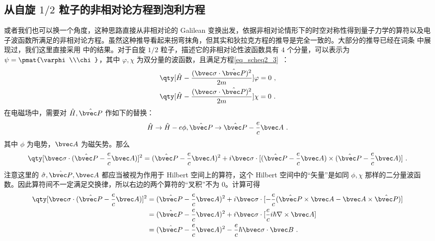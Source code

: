 \subsection{从自旋 $1/2$ 粒子的非相对论方程到泡利方程}
或者我们也可以换一个角度，这种思路直接从非相对论的 Galilean 变换出发\cite{刘觉平}，依据非相对论情形下的时空对称性得到量子力学的算符以及电子波函数所满足的非相对论方程。虽然这种推导看起来拐弯抹角，但其实和狄拉克方程的推导是完全一致的。大部分的推导已经在词条  中展现过，我们这里直接采用 中的结果。对于自旋 $1/2$ 粒子，描述它的非相对论性波函数具有 $4$ 个分量，可以表示为 $\psi=\pmat{\varphi\\\chi}$，其中 $\varphi,\chi$ 为双分量的波函数，且满足方程\autoref{eq_scheq2_3}~：
\begin{equation}
\begin{aligned}
&\qty[\hat H-\frac{(\bvec \sigma\cdot \hat{\bvec P})^2}{2m}]\varphi=0~,\\
&
\qty[\hat H-\frac{(\bvec \sigma\cdot \hat{\bvec P})^2}{2m}]\chi=0~.
\end{aligned}
\end{equation}
在电磁场中，需要对 $\hat H,\hat{\bvec P}$ 作如下的替换：
\begin{equation}
\hat H\rightarrow \hat H-e\phi, \hat{\bvec P}\rightarrow \hat{\bvec P}-\frac{e}{c}\bvec A~.
\end{equation}
其中 $\phi$ 为电势，$\bvec A$ 为磁矢势。那么
\begin{equation}\label{eq_Pauli_1}
\qty[\bvec \sigma\cdot(\hat{\bvec P}-\frac{e}{c}\bvec A)]^2=(\hat{\bvec P}-\frac{e}{c}\bvec A)^2+i\bvec \sigma\cdot[(\hat{\bvec P}-\frac{e}{c}\bvec A)\times (\hat{\bvec P}-\frac{e}{c}\bvec A)]~.
\end{equation}
注意这里的 $\hat \sigma,\hat{\bvec P},\bvec A$ 都应当被视为作用于 Hilbert 空间上的算符，这个 Hilbert 空间中的“矢量”是如同 $\phi,\chi$ 那样的二分量波函数。因此算符间不一定满足交换律，所以右边的两个算符的“叉积”不为 $0$。计算可得
\begin{equation}
\begin{aligned}
\qty[\bvec \sigma \cdot (\hat{\bvec P}-\frac{e}{c}\bvec A)]^2
&=(\hat{\bvec P}-\frac{e}{c}\bvec A)^2+i\bvec \sigma\cdot[-\frac{e}{c}(\hat{\bvec P}\times \bvec A- \bvec A\times \hat{\bvec P})]\\
&=(\hat{\bvec P}-\frac{e}{c}\bvec A)^2+i\bvec \sigma\cdot[\frac{e}{c}i\hbar \nabla \times  \bvec A]\\
&=(\hat{\bvec P}-\frac{e}{c}\bvec A)^2-\frac{e}{c}\hbar\bvec \sigma\cdot \bvec B~.
\end{aligned}
\end{equation}
